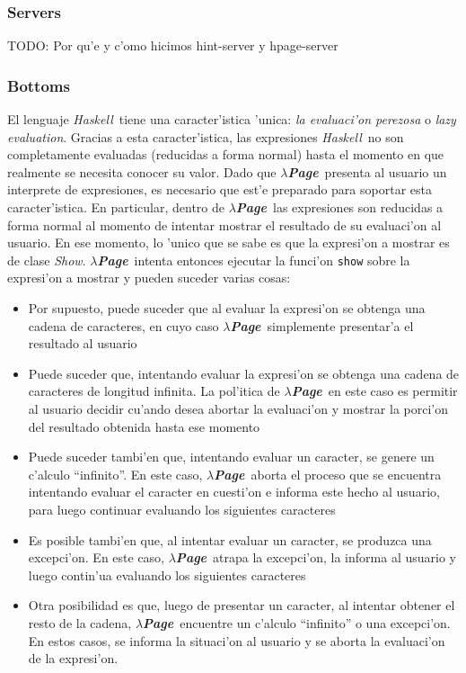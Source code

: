 \documentclass[a4paper]{article}
\newcommand{\haskell}{\textsl{Haskell}}
\newcommand{\hpage}{\textbf{\textsl{$\lambda$Page}}}
\begin{document}
\subsubsection{Servers} TODO: Por qu'e y c'omo hicimos hint-server y hpage-server
\subsubsection{Bottoms}El lenguaje \haskell\ tiene una caracter'istica 'unica: \textsl{la evaluaci'on perezosa} o \textsl{lazy evaluation}.  Gracias a esta caracter'istica, las expresiones \haskell\ no son completamente evaluadas (reducidas a forma normal) hasta el momento en que realmente se necesita conocer su valor.  Dado que \hpage\ presenta al usuario un interprete de expresiones, es necesario que est'e preparado para soportar esta caracter'istica.  En particular, dentro de \hpage\ las expresiones son reducidas a forma normal al momento de intentar mostrar el resultado de su evaluaci'on al usuario.  En ese momento, lo 'unico que se sabe es que la expresi'on a mostrar es de clase \textsl{Show}.  \hpage\ intenta entonces ejecutar la funci'on \texttt{show} sobre la expresi'on a mostrar y pueden suceder varias cosas:
\begin{itemize}
	\item Por supuesto, puede suceder que al evaluar la expresi'on se obtenga una cadena de caracteres, en cuyo caso \hpage\ simplemente presentar'a el resultado al usuario
	\item Puede suceder que, intentando evaluar la expresi'on se obtenga una cadena de caracteres de longitud infinita.  La pol'itica de \hpage\ en este caso es permitir al usuario decidir cu'ando desea abortar la evaluaci'on y mostrar la porci'on del resultado obtenida hasta ese momento
	\item Puede suceder tambi'en que, intentando evaluar un caracter, se genere un c'alculo ``infinito''.  En este caso, \hpage\ aborta el proceso que se encuentra intentando evaluar el caracter en cuesti'on e informa este hecho al usuario, para luego continuar evaluando los siguientes caracteres
	\item Es posible tambi'en que, al intentar evaluar un caracter, se produzca una excepci'on.  En este caso, \hpage\ atrapa la excepci'on, la informa al usuario y luego contin'ua evaluando los siguientes caracteres
	\item Otra posibilidad es que, luego de presentar un caracter, al intentar obtener el resto de la cadena, \hpage\ encuentre un c'alculo ``infinito'' o una excepci'on.  En estos casos, se informa la situaci'on al usuario y se aborta la evaluaci'on de la expresi'on.
\end{itemize}
\end{document}
